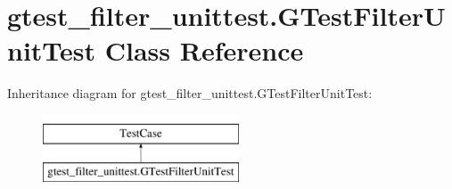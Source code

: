 \hypertarget{classgtest__filter__unittest_1_1_g_test_filter_unit_test}{\section{gtest\-\_\-filter\-\_\-unittest.\-G\-Test\-Filter\-Unit\-Test Class Reference}
\label{classgtest__filter__unittest_1_1_g_test_filter_unit_test}
}
Inheritance diagram for gtest\-\_\-filter\-\_\-unittest.\-G\-Test\-Filter\-Unit\-Test\-:\begin{figure}[H]
\begin{center}
\leavevmode
\includegraphics[height=2.000000cm]{classgtest__filter__unittest_1_1_g_test_filter_unit_test}
\end{center}
\end{figure}
